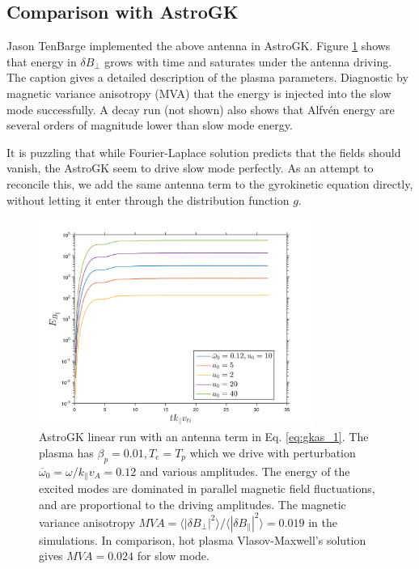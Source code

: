 \documentclass[12pt]{article}
\begin{document}
\subsection{Comparison with AstroGK}
Jason TenBarge implemented the above antenna in AstroGK. Figure \ref{fig:bpar_t_1} shows that energy in $\delta B_\perp$ grows with time and saturates under the antenna driving. The caption gives a detailed description of the plasma parameters. Diagnostic by magnetic variance anisotropy (MVA) that the energy is injected into the slow mode successfully. A decay run (not shown) also shows that Alfv{\'e}n energy are several orders of magnitude lower than slow mode energy. 

It is puzzling that while Fourier-Laplace solution predicts that the fields should vanish, the AstroGK seem to drive slow mode perfectly. As an attempt to reconcile this, we add the same antenna term  to the gyrokinetic equation directly, without letting it enter through the distribution function $g$. 

\begin{figure}
\centering
\includegraphics[width=0.8\textwidth]{figure/Ebpar_t_u0_1.png}
\caption{AstroGK linear run with an antenna term in Eq. \ref{eq:gkas_1}. The plasma has $\beta_p = 0.01, T_e = T_p$  which we drive with perturbation $\overline{\omega}_0 = \omega/ k_\parallel v_A = 0.12$ and various amplitudes. The energy of the excited modes are dominated in parallel magnetic field fluctuations, and are proportional to the driving amplitudes. The magnetic variance anisotropy $MVA = \langle |\delta B_\perp |^2\rangle / \langle |\delta B_\parallel|^2 \rangle = 0.019$ in the simulations. In comparison, hot plasma Vlasov-Maxwell's solution gives $MVA=0.024$ for slow mode. }
\label{fig:bpar_t_1}
\end{figure}
\end{document}
